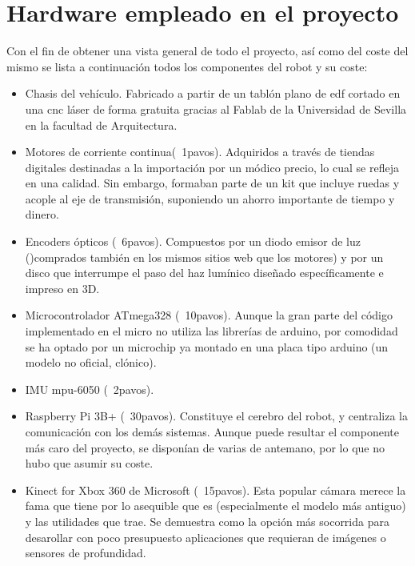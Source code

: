 \section{Hardware empleado en el proyecto}
Con el fin de obtener una vista general de todo el proyecto, así como del coste del mismo se lista a continuación todos los componentes del robot y su coste:
\begin{itemize}
	\item Chasis del vehículo. Fabricado a partir de un tablón plano de edf cortado en una cnc láser de forma gratuita gracias al Fablab de la Universidad de Sevilla en la facultad de Arquitectura.
	\item Motores de corriente continua(~1pavos). Adquiridos a través de tiendas digitales destinadas a la importación por un módico precio, lo cual se refleja en una calidad. Sin embargo, formaban parte de un kit que incluye ruedas y acople al eje de transmisión, suponiendo un ahorro importante de tiempo y dinero. 
	\item Encoders ópticos (~6pavos). Compuestos por un diodo emisor de luz ()comprados también en los mismos sitios web que los motores) y por un disco que interrumpe el paso del haz lumínico diseñado específicamente e impreso en 3D.
	\item Microcontrolador ATmega328 (~10pavos). Aunque la gran parte del código implementado en el micro no utiliza las librerías de arduino, por comodidad se ha optado por un microchip ya montado en una placa tipo arduino (un modelo no oficial, clónico).
	\item IMU mpu-6050 (~2pavos).
	\item Raspberry Pi 3B+ (~30pavos). Constituye el cerebro del robot, y centraliza la comunicación con los demás sistemas. Aunque puede resultar el componente más caro del proyecto, se disponían de varias de antemano, por lo que no hubo que asumir su coste.
	\item Kinect for Xbox 360 de Microsoft (~15pavos). Esta popular cámara merece la fama que tiene por lo asequible que es (especialmente el modelo más antiguo) y las utilidades que trae. Se demuestra como la opción más socorrida para desarollar con poco presupuesto aplicaciones que requieran de imágenes o sensores de profundidad.
	
\end{itemize}
